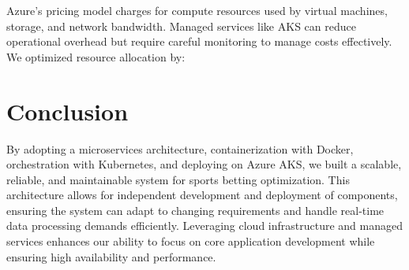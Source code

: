 Azure's pricing model charges for compute resources used by virtual machines, storage, and network bandwidth. Managed services like AKS can reduce operational overhead but require careful monitoring to manage costs effectively. We optimized resource allocation by:


\section{Conclusion}

By adopting a microservices architecture, containerization with Docker, orchestration with Kubernetes, and deploying on Azure AKS, we built a scalable, reliable, and maintainable system for sports betting optimization. This architecture allows for independent development and deployment of components, ensuring the system can adapt to changing requirements and handle real-time data processing demands efficiently. Leveraging cloud infrastructure and managed services enhances our ability to focus on core application development while ensuring high availability and performance.
